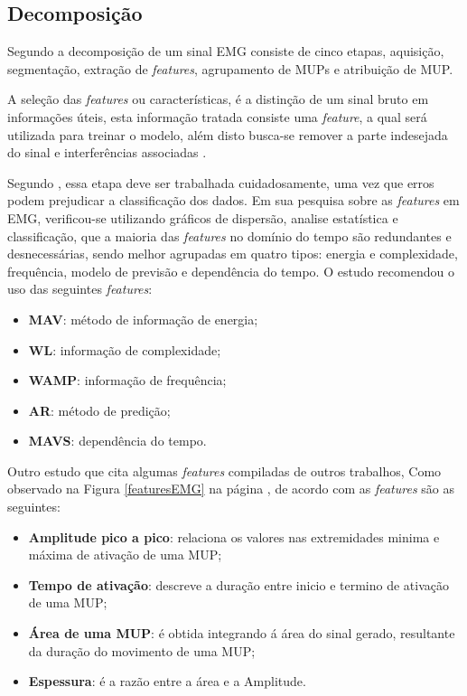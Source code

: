 \subsection{Decomposição}
Segundo  a decomposição de um sinal EMG consiste de cinco etapas, aquisição, segmentação, extração de \textit{features}, agrupamento de MUPs e atribuição de MUP.

A seleção das \textit{features} ou características, é a distinção de um sinal bruto em informações úteis, esta informação tratada consiste uma \textit{feature}, a qual será utilizada para treinar o modelo, além disto busca-se remover a parte indesejada do sinal e interferências associadas \cite{phinyomark2012feature}.

Segundo , essa etapa deve ser trabalhada cuidadosamente, uma vez que erros podem prejudicar a classificação dos dados. Em sua pesquisa sobre as \textit{features} em EMG, verificou-se utilizando gráficos de dispersão, analise estatística e classificação, que a maioria das \textit{features} no domínio do tempo são redundantes e desnecessárias, sendo melhor agrupadas em quatro tipos: energia e complexidade, frequência, modelo de previsão e dependência do tempo. O estudo recomendou o uso das seguintes \textit{features}:

\begin{itemize}
    \item \textbf{MAV}: método de informação de energia;
    \item \textbf{WL}: informação de complexidade;
    \item \textbf{WAMP}: informação de frequência;
    \item \textbf{AR}: método de predição;
    \item \textbf{MAVS}: dependência do tempo.
\end{itemize}

Outro estudo que cita algumas \textit{features} compiladas de outros trabalhos, Como observado na Figura \ref{featuresEMG} na página \pageref{featuresEMG}, de acordo com  as \textit{features} são as seguintes:

\begin{itemize}
    \item \textbf{Amplitude pico a pico}: relaciona os valores nas extremidades minima e máxima de ativação de uma MUP;
    \item \textbf{Tempo de ativação}: descreve a duração entre inicio e termino de ativação de uma MUP;
    \item \textbf{Área de uma MUP}: é obtida integrando á área do sinal gerado, resultante da duração do movimento de uma MUP;
    \item \textbf{Espessura}: é a razão entre a área e a Amplitude.
\end{itemize}

